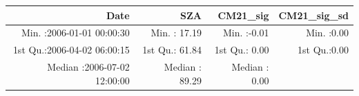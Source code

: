 \documentclass[
  10pt,
  a4paper,oneside]{article}
\begin{document}
\begin{longtable}[]{@{}rrrr@{}}
\toprule
\begin{minipage}[b]{0.34\columnwidth}\raggedleft
Date\strut
\end{minipage} & \begin{minipage}[b]{0.19\columnwidth}\raggedleft
SZA\strut
\end{minipage} & \begin{minipage}[b]{0.18\columnwidth}\raggedleft
CM21\_sig\strut
\end{minipage} & \begin{minipage}[b]{0.18\columnwidth}\raggedleft
CM21\_sig\_sd\strut
\end{minipage}\tabularnewline
\midrule
\endhead
\begin{minipage}[t]{0.34\columnwidth}\raggedleft
Min. :2006-01-01 00:00:30\strut
\end{minipage} & \begin{minipage}[t]{0.19\columnwidth}\raggedleft
Min. : 17.19\strut
\end{minipage} & \begin{minipage}[t]{0.18\columnwidth}\raggedleft
Min. :-0.01\strut
\end{minipage} & \begin{minipage}[t]{0.18\columnwidth}\raggedleft
Min. :0.00\strut
\end{minipage}\tabularnewline
\begin{minipage}[t]{0.34\columnwidth}\raggedleft
1st Qu.:2006-04-02 06:00:15\strut
\end{minipage} & \begin{minipage}[t]{0.19\columnwidth}\raggedleft
1st Qu.: 61.84\strut
\end{minipage} & \begin{minipage}[t]{0.18\columnwidth}\raggedleft
1st Qu.: 0.00\strut
\end{minipage} & \begin{minipage}[t]{0.18\columnwidth}\raggedleft
1st Qu.:0.00\strut
\end{minipage}\tabularnewline
\begin{minipage}[t]{0.34\columnwidth}\raggedleft
Median :2006-07-02 12:00:00\strut
\end{minipage} & \begin{minipage}[t]{0.19\columnwidth}\raggedleft
Median : 89.29\strut
\end{minipage} & \begin{minipage}[t]{0.18\columnwidth}\raggedleft
Median : 0.00\strut
\end{minipage} & \begin{minipage}[t]{0.18\columnwidth}\raggedleft

\end{minipage}
\end{longtable}
\end{document}
